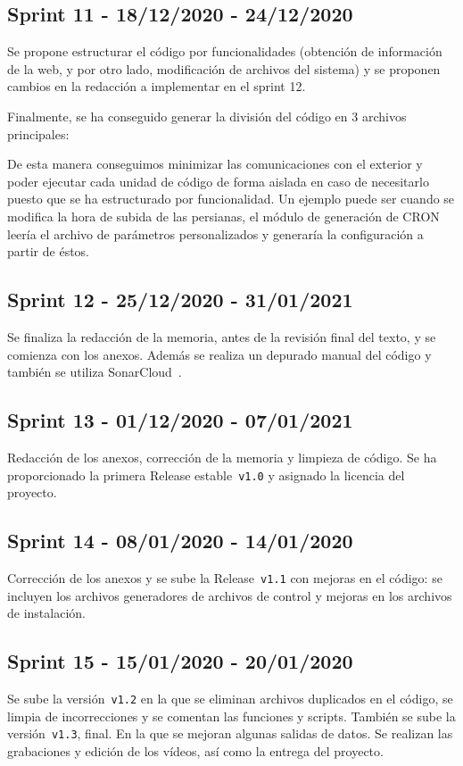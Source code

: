 \subsection{Sprint 11 - 18/12/2020 - 24/12/2020}
Se propone estructurar el código por funcionalidades (obtención de información de la web, y por otro lado, modificación de archivos del sistema) y se proponen cambios en la redacción a implementar en el sprint 12.


Finalmente, se ha conseguido generar la división del código en 3 archivos principales:

De esta manera conseguimos minimizar las comunicaciones con el exterior y poder ejecutar cada unidad de código de forma aislada en caso de necesitarlo puesto que se ha estructurado por funcionalidad. Un ejemplo puede ser cuando se modifica la hora de subida de las persianas, el módulo de generación de CRON leería el archivo de parámetros personalizados y generaría la configuración a partir de éstos.


\subsection{Sprint 12 - 25/12/2020 - 31/01/2021}
Se finaliza la redacción de la memoria, antes de la revisión final del texto, y se comienza con los anexos. Además se realiza un depurado manual del código y también se utiliza SonarCloud~\cite{misc:sonarcloud}.

\subsection{Sprint 13 - 01/12/2020 - 07/01/2021}
Redacción de los anexos, corrección de la memoria y limpieza de código.
Se ha proporcionado la primera Release estable~\texttt{v1.0} y asignado la licencia del proyecto.

\subsection{Sprint 14 - 08/01/2020 - 14/01/2020}
Corrección de los anexos y se sube la Release~\texttt{v1.1} con mejoras en el código: se incluyen los archivos generadores de archivos de control y mejoras en los archivos de instalación.

\subsection{Sprint 15 - 15/01/2020 - 20/01/2020}
Se sube la versión~\texttt{v1.2} en la que se eliminan archivos duplicados en el código, se limpia de incorrecciones y se comentan las funciones y scripts. También se sube la versión~\texttt{v1.3}, final. En la que se mejoran algunas salidas de datos.
Se realizan las grabaciones y edición de los vídeos, así como la entrega del proyecto.


